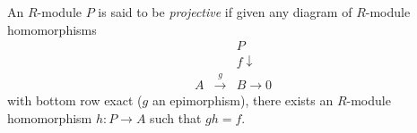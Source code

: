 An $R$-module $P$ is said to be \emph{projective} if given any diagram of $R$-module homomorphisms
\[
\begin{array}{ccc}
& & P \\
& & f \downarrow \\
A & \xrightarrow{g} & B \to 0
\end{array}
\]
with bottom row exact ($g$ an epimorphism), there exists an $R$-module homomorphism $h : P \to A$ such that $gh = f$.
